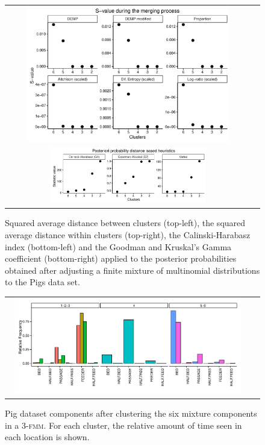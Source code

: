 \documentclass[submit]{smj}
\theoremstyle{definition}
\newcommand{\fmm}{\textsc{fmm}\xspace}
\begin{document}
\begin{figure}[thpb]
\begin{center}
\begin{tabular}{cc}
  \includegraphics[width=0.85\textwidth]{figures/multinomial_Svalues_all.pdf} \\
  \includegraphics[width=0.65\textwidth]{figures/multinomial_statistics.pdf} 
 \end{tabular}
 \caption{Squared average distance between clusters (top-left), the squared average distance within clusters (top-right), the Calinski-Harabasz index (bottom-left) and the Goodman and Kruskal's Gamma coefficient (bottom-right) applied to the posterior probabilities obtained after adjusting a finite mixture of multinomial distributions to the Pigs data set.}\label{multinomial_statistics}
\end{center}
\end{figure}

\begin{figure}[htpb]
\begin{center}
\begin{tabular}{cc}
  \includegraphics[width=0.95\textwidth]{figures/multinomial_clust3_all.pdf} \\
 \end{tabular}
 \caption{Pig dataset components after clustering the six mixture components in a 3-\fmm. For each cluster, the relative amount of time seen in each location is shown.}\label{multinomial_clust3}
\end{center}
\end{figure}
\end{document}
